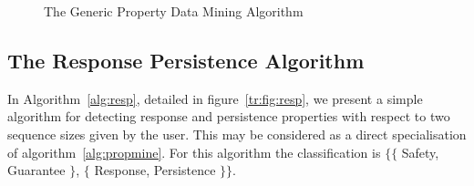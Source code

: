 {\line
\begin{figure}[ht]
\begin{center}
\caption{\label{tr:fig:propmine} The Generic Property Data Mining Algorithm}
\end{center}
\end{figure}
}



\subsection{The Response Persistence Algorithm}\label{subsec:tr_resppers}

In Algorithm~\ref{alg:resp}, detailed in figure~\ref{tr:fig:resp}, we
present a simple algorithm for detecting response and persistence
properties with respect to two sequence sizes given by the user. This
may be considered as a direct specialisation of
algorithm~\ref{alg:propmine}. For this algorithm the classification is
$\{ \{$ Safety, Guarantee $\}$, $\{$ Response, Persistence $\} \}$.


